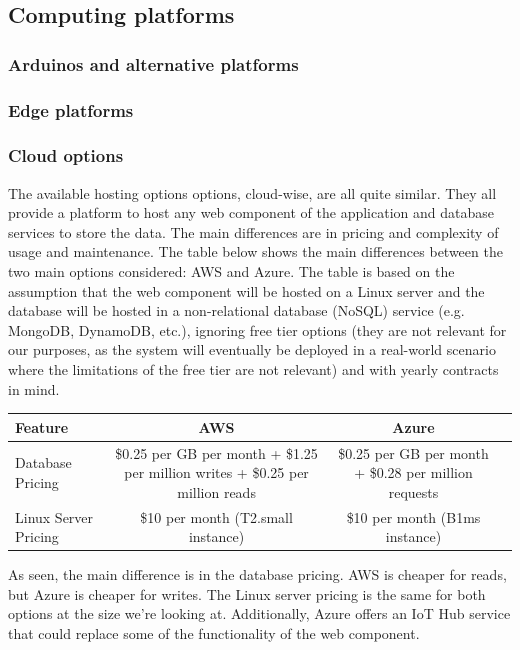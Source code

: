 \subsection{Computing platforms}
\subsubsection{Arduinos and alternative platforms}
\subsubsection{Edge platforms}
\subsubsection{Cloud options}
The available hosting options options, cloud-wise, are all quite similar. They all
provide a platform to host any web component of the application and database services
to store the data. The main differences are in pricing and complexity of usage and
maintenance. The table below shows the main differences between the two main
options considered: AWS and Azure. The table is based on the assumption
that the web component will be hosted on a Linux server and the database will be
hosted in a non-relational database (NoSQL) service (e.g. MongoDB, DynamoDB, etc.),
ignoring free tier options (they are not relevant for our purposes, as the system will
eventually be deployed in a real-world scenario where the limitations of the free
tier are not relevant) and with yearly contracts in mind.

\begin{table}
    \centering
    \begin{tabularx}{\columnwidth}{|l|c|c|c|}
        \hline
        \textbf{Feature} & \textbf{AWS} & \textbf{Azure} \\
        \hline
        Database Pricing &
            \$0.25 per GB per month + \$1.25 per million writes + \$0.25 per million reads & 
            \$0.25 per GB per month + \$0.28 per million requests \\
        \hline
        Linux Server Pricing &
            \$10 per month (T2.small instance)& 
            \$10 per month (B1ms instance) \\
        \end{tabularx}
\end{table}

As seen, the main difference is in the database pricing. AWS is cheaper for reads,
but Azure is cheaper for writes. The Linux server pricing is the same for both options
at the size we're looking at. Additionally, Azure offers an IoT Hub service that
could replace some of the functionality of the web component.
